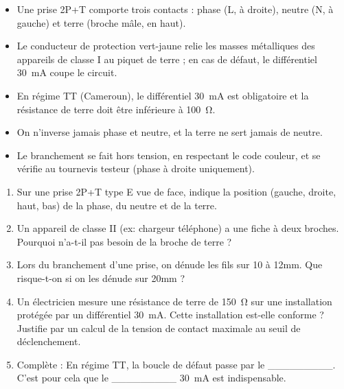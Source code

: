 \documentclass[11pt]{article}
\begin{document}
\begin{aretenir}
\begin{itemize}
\item Une prise 2P+T comporte trois contacts : phase (L, à droite), neutre (N, à gauche) et terre (broche mâle, en haut).
\item Le conducteur de protection vert-jaune relie les masses métalliques des appareils de classe I au piquet de terre ; en cas de défaut, le différentiel \SI{30}{mA} coupe le circuit.
\item En régime TT (Cameroun), le différentiel \SI{30}{mA} est obligatoire et la résistance de terre doit être inférieure à \SI{100}{\ohm}.
\item On n'inverse jamais phase et neutre, et la terre ne sert jamais de neutre.
\item Le branchement se fait hors tension, en respectant le code couleur, et se vérifie au tournevis testeur (phase à droite uniquement).
\end{itemize}
\end{aretenir}

\begin{exercice}
\begin{enumerate}
\item Sur une prise 2P+T type E vue de face, indique la position (gauche, droite, haut, bas) de la phase, du neutre et de la terre.
\item Un appareil de classe II (ex: chargeur téléphone) a une fiche à deux broches. Pourquoi n'a-t-il pas besoin de la broche de terre ?
\item Lors du branchement d'une prise, on dénude les fils sur \num{10} à \num{12}{mm}. Que risque-t-on si on les dénude sur \num{20}{mm} ?
\item Un électricien mesure une résistance de terre de \SI{150}{\ohm} sur une installation protégée par un différentiel \SI{30}{mA}. Cette installation est-elle conforme ? Justifie par un calcul de la tension de contact maximale au seuil de déclenchement.
\item Complète : En régime TT, la boucle de défaut passe par le \_\_\_\_\_\_\_\_\_. C'est pour cela que le \_\_\_\_\_\_\_\_\_ \SI{30}{mA} est indispensable.
\end{enumerate}
\end{exercice}
\end{document}
